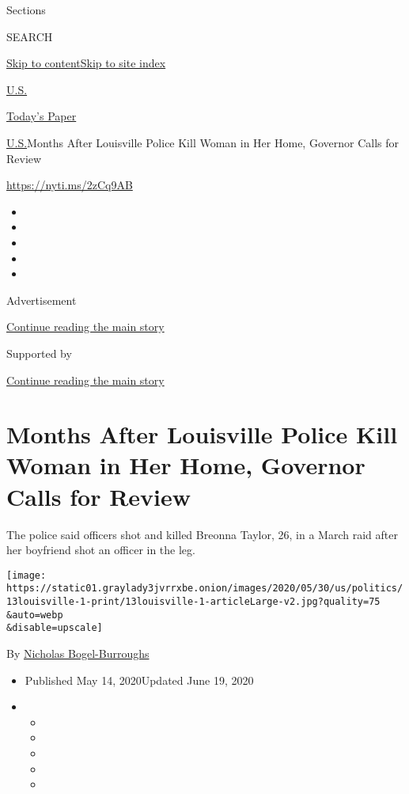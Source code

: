 Sections

SEARCH

\protect\hyperlink{site-content}{Skip to
content}\protect\hyperlink{site-index}{Skip to site index}

\href{https://www.nytimes3xbfgragh.onion/section/us}{U.S.}

\href{https://myaccount.nytimes3xbfgragh.onion/auth/login?response_type=cookie\&client_id=vi}{}

\href{https://www.nytimes3xbfgragh.onion/section/todayspaper}{Today's
Paper}

\href{/section/us}{U.S.}\textbar{}Months After Louisville Police Kill
Woman in Her Home, Governor Calls for Review

\url{https://nyti.ms/2zCq9AB}

\begin{itemize}
\item
\item
\item
\item
\item
\end{itemize}

Advertisement

\protect\hyperlink{after-top}{Continue reading the main story}

Supported by

\protect\hyperlink{after-sponsor}{Continue reading the main story}

\hypertarget{months-after-louisville-police-kill-woman-in-her-home-governor-calls-for-review}{%
\section{Months After Louisville Police Kill Woman in Her Home, Governor
Calls for
Review}\label{months-after-louisville-police-kill-woman-in-her-home-governor-calls-for-review}}

The police said officers shot and killed Breonna Taylor, 26, in a March
raid after her boyfriend shot an officer in the leg.

\texttt{[image: https://static01.graylady3jvrrxbe.onion/images/2020/05/30/us/politics/13louisville-1-print/13louisville-1-articleLarge-v2.jpg?quality=75\\\&auto=webp\\\&disable=upscale]}

By
\href{https://www.nytimes3xbfgragh.onion/by/nicholas-bogel-burroughs}{Nicholas
Bogel-Burroughs}

\begin{itemize}
\item
  Published May 14, 2020Updated June 19, 2020
\item
  \begin{itemize}
  \item
  \item
  \item
  \item
  \item
  \end{itemize}
\end{itemize}

